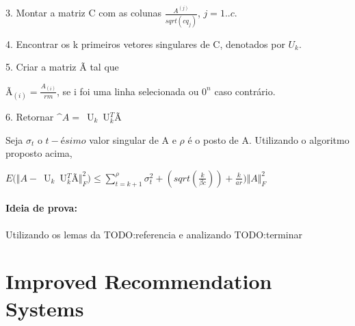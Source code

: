 \documentclass[a4paper,10pt]{article}
\begin{document}
3. Montar a matriz C com as colunas $\frac{A^(j)}{sqrt(cq_j)}$, $j = 1 .. c$.

4. Encontrar os k primeiros vetores singulares de C, denotados por $U_k$.

5. Criar a matriz Ã tal que 

Ã$_{(i)}  = \frac{A_{(i)}}{rm}$, se i foi uma linha selecionada ou $0^n$ caso contrário.

6. Retornar $\^A = $~U$_k$~U$_k^T$Ã


\begin{teo}
Seja $\sigma_t$ o $t-ésimo$ valor singular de A e $\rho$ é o posto de A. Utilizando
o algoritmo proposto acima, 

$E(\Vert A - $~U$_k$~U$_k^T$Ã$ \Vert^2_F) \leq \sum_{t = k + 1}^\rho \sigma_t^2 + 
(sqrt(\frac{k}{\beta c}))  + \frac{k}{ar})\Vert A \Vert^2_F
$
\end{teo}

\paragraph{Ideia de prova:} Utilizando os lemas da TODO:referencia e 
analizando TODO:terminar

\section{Improved Recommendation Systems}




\end{document}
